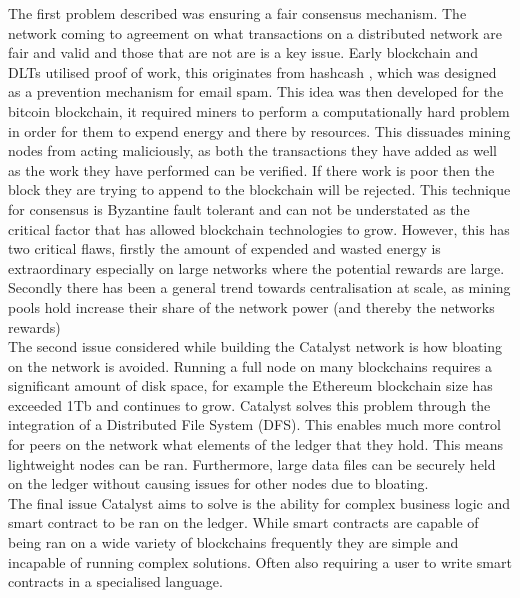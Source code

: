 The first problem described was ensuring a fair consensus mechanism. The network coming to agreement on what transactions on a distributed network are fair and valid and those that are not are is a key issue. Early blockchain and DLTs utilised proof of work, this originates from hashcash \cite{back2002hashcash}, which was designed as a prevention mechanism for email spam. This idea was then developed for the bitcoin blockchain, it required miners to perform a computationally hard problem in order for them to expend energy and there by resources. This dissuades mining nodes from acting maliciously, as both the transactions they have added as well as the work they have performed can be verified. If there work is poor then the block they are trying to append to the blockchain will be rejected. This technique for consensus is Byzantine fault tolerant and can not be understated as the critical factor that has allowed blockchain technologies to grow. However, this has two critical flaws, firstly the amount of expended and wasted energy is extraordinary especially on large networks where the potential rewards are large. Secondly there has been a general trend towards centralisation at scale, as mining pools hold increase their share of the network power (and thereby the networks rewards) \\

The second issue considered while building the Catalyst network is how bloating on the network is avoided. Running a full node on many blockchains requires a significant amount of disk space, for example the Ethereum blockchain size has exceeded 1Tb \cite{EthBloat} and continues to grow. Catalyst solves this problem through the integration of a Distributed File System (DFS). This enables much more control for peers on the network what elements of the ledger that they hold. This means lightweight nodes can be ran. Furthermore, large data files can be securely held on the ledger without causing issues for other nodes due to bloating. \\

The final issue Catalyst aims to solve is the ability for complex business logic and smart contract to be ran on the ledger. While smart contracts are capable of being ran on a wide variety of blockchains frequently they are simple and incapable of running complex solutions. Often also requiring a user to write smart contracts in a specialised language. \\